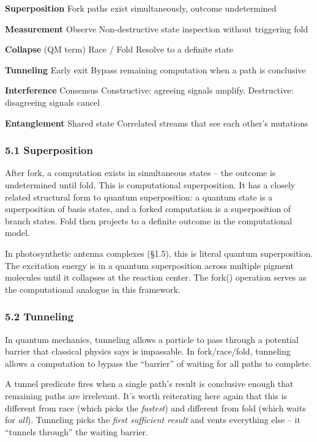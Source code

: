 \documentclass[
]{article}
\begin{document}
\textbf{Superposition} \textbar{} Fork \textbar{} paths exist
simultaneously, outcome undetermined \textbar{}

\textbf{Measurement} \textbar{} Observe \textbar{} Non-destructive state
inspection without triggering fold \textbar{}

\textbf{Collapse} (QM term) \textbar{} Race / Fold \textbar{} Resolve to
a definite state \textbar{}

\textbf{Tunneling} \textbar{} Early exit \textbar{} Bypass remaining
computation when a path is conclusive \textbar{}

\textbf{Interference} \textbar{} Consensus \textbar{} Constructive:
agreeing signals amplify. Destructive: disagreeing signals cancel
\textbar{}

\textbf{Entanglement} \textbar{} Shared state \textbar{} Correlated
streams that see each other's mutations \textbar{}

\subsubsection{\texorpdfstring{\textbf{5.1
Superposition}}{5.1 Superposition}}\label{superposition}

After fork, a computation exists in simultaneous states -- the outcome
is undetermined until fold. This is computational superposition. It has
a closely related structural form to quantum superposition: a quantum
state is a superposition of basis states, and a forked computation is a
superposition of branch states. Fold then projects to a definite outcome
in the computational model.

In photosynthetic antenna complexes (§1.5), this is literal quantum
superposition. The excitation energy is in a quantum superposition
across multiple pigment molecules until it collapses at the reaction
center. The fork() operation serves as the computational analogue in
this framework.

\subsubsection{\texorpdfstring{\textbf{5.2
Tunneling}}{5.2 Tunneling}}\label{tunneling}

In quantum mechanics, tunneling allows a particle to pass through a
potential barrier that classical physics says is impassable. In
fork/race/fold, tunneling allows a computation to bypass the ``barrier''
of waiting for all paths to complete.

A tunnel predicate fires when a single path's result is conclusive
enough that remaining paths are irrelevant. It's worth reiterating here
again that this is different from race (which picks the \emph{fastest})
and different from fold (which waits for \emph{all}). Tunneling picks
the \emph{first sufficient result} and vents everything else -- it
``tunnels through'' the waiting barrier.
\end{document}
